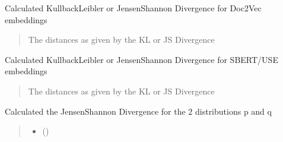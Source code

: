\documentclass[letterpaper,10pt,english]{sphinxmanual}
\begin{document}
\begin{fulllineitems}
\begin{fulllineitems}
\label{\detokenize{fldModules/myDetectors:myDetectors.myDetectors.divergence_doc2vec}}
\pysigstartsignatures
{}
\pysigstopsignatures
\sphinxAtStartPar
Calculated Kullback\textendash{}Leibler or Jensen\textendash{}Shannon Divergence for Doc2Vec embeddings
\begin{quote}\begin{description}
\sphinxAtStartPar
The distances as given by the KL or JS Divergence

\end{description}\end{quote}

\end{fulllineitems}


\begin{fulllineitems}
\label{\detokenize{fldModules/myDetectors:myDetectors.myDetectors.divergence_seneconders}}
\pysigstartsignatures
{}
\pysigstopsignatures
\sphinxAtStartPar
Calculated Kullback\textendash{}Leibler or Jensen\textendash{}Shannon Divergence for SBERT/USE embeddings
\begin{quote}\begin{description}
\sphinxAtStartPar
The distances as given by the KL or JS Divergence

\end{description}\end{quote}

\end{fulllineitems}


\begin{fulllineitems}
\label{\detokenize{fldModules/myDetectors:myDetectors.myDetectors.js_divergence}}
\pysigstartsignatures
{}
\pysigstopsignatures
\sphinxAtStartPar
Calculated the Jensen\textendash{}Shannon Divergence for the 2 distributions p and q
\begin{quote}\begin{description}
\begin{itemize}
\item {} 
\sphinxAtStartPar
{} () \textendash{} 


\end{itemize}
\end{description}
\end{quote}
\end{fulllineitems}
\end{fulllineitems}
\end{document}
